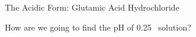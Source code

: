 \documentclass[notes=hide]{beamer}
\begin{document}
%
%
%
%
%
%

\begin{frame}[t]{The Acidic Form: Glutamic Acid Hydrochloride}
	\begin{center}
		 \quad
	\end{center}

	How are we going to find the pH of \SI{0.25}{\Molar}~ solution?
\end{frame}

\end{document}
